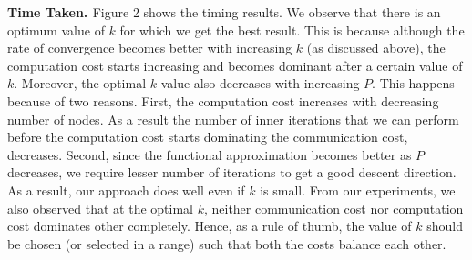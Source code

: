 {\bf{Time Taken. }}Figure 2 shows the timing results. We observe that there is an optimum value of $k$ for which we get the best result. This is because although the rate of convergence becomes better with increasing $k$ (as discussed above), the computation cost starts increasing and becomes dominant after a certain value of $k$. Moreover, the optimal $k$ value also decreases with increasing $P$. This happens because of two reasons. First, the computation cost increases with decreasing number of nodes. As a result the number of inner iterations that we can perform before the computation cost starts dominating the communication cost, decreases. Second, since the functional approximation becomes better as $P$ decreases, we require lesser number of iterations to get a good descent direction. As a result, our approach does well even if $k$ is small. From our experiments, we also observed that at the optimal $k$, neither communication cost nor computation cost dominates other completely. Hence, as a rule of thumb, the value of $k$ should be chosen (or selected in a range) such that both the costs balance each other.


